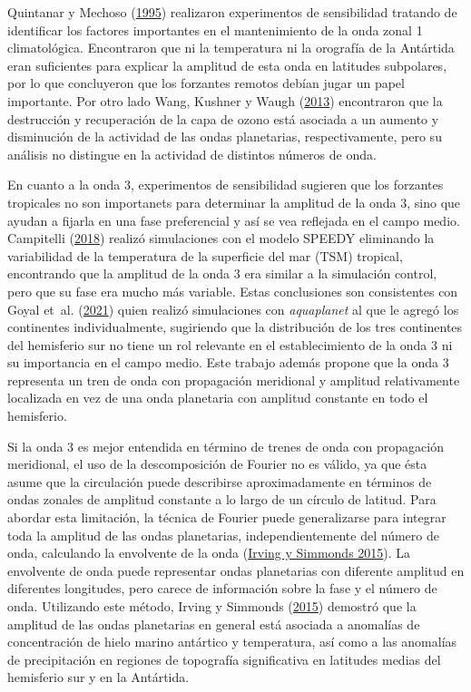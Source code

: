 \documentclass[12pt,oneside,a4paper]{reedthesis}
\begin{document}
Quintanar y Mechoso (\protect\hyperlink{ref-quintanar1995a}{1995}) realizaron experimentos de sensibilidad tratando de identificar los factores importantes en el mantenimiento de la onda zonal 1 climatológica.
Encontraron que ni la temperatura ni la orografía de la Antártida eran suficientes para explicar la amplitud de esta onda en latitudes subpolares, por lo que concluyeron que los forzantes remotos debían jugar un papel importante.
Por otro lado Wang, Kushner y Waugh (\protect\hyperlink{ref-wang2013}{2013}) encontraron que la destrucción y recuperación de la capa de ozono está asociada a un aumento y disminución de la actividad de las ondas planetarias, respectivamente, pero su análisis no distingue en la actividad de distintos números de onda.

En cuanto a la onda 3, experimentos de sensibilidad sugieren que los forzantes tropicales no son importanets para determinar la amplitud de la onda 3, sino que ayudan a fijarla en una fase preferencial y así se vea reflejada en el campo medio.
Campitelli (\protect\hyperlink{ref-campitelli2018b}{2018}) realizó simulaciones con el modelo SPEEDY eliminando la variabilidad de la temperatura de la superficie del mar (TSM) tropical, encontrando que la amplitud de la onda 3 era similar a la simulación control, pero que su fase era mucho más variable.
Estas conclusiones son consistentes con Goyal et~al. (\protect\hyperlink{ref-goyal2021a}{2021}) quien realizó simulaciones con \emph{aquaplanet} al que le agregó los continentes individualmente, sugiriendo que la distribución de los tres continentes del hemisferio sur no tiene un rol relevante en el establecimiento de la onda 3 ni su importancia en el campo medio.
Este trabajo además propone que la onda 3 representa un tren de onda con propagación meridional y amplitud relativamente localizada en vez de una onda planetaria con amplitud constante en todo el hemisferio.

Si la onda 3 es mejor entendida en término de trenes de onda con propagación meridional, el uso de la descomposición de Fourier no es válido, ya que ésta asume que la circulación puede describirse aproximadamente en términos de ondas zonales de amplitud constante a lo largo de un círculo de latitud.
Para abordar esta limitación, la técnica de Fourier puede generalizarse para integrar toda la amplitud de las ondas planetarias, independientemente del número de onda, calculando la envolvente de la onda (\protect\hyperlink{ref-irving2015}{Irving y Simmonds 2015}).
La envolvente de onda puede representar ondas planetarias con diferente amplitud en diferentes longitudes, pero carece de información sobre la fase y el número de onda.
Utilizando este método, Irving y Simmonds (\protect\hyperlink{ref-irving2015}{2015}) demostró que la amplitud de las ondas planetarias en general está asociada a anomalías de concentración de hielo marino antártico y temperatura, así como a las anomalías de precipitación en regiones de topografía significativa en latitudes medias del hemisferio sur y en la Antártida.
\end{document}
